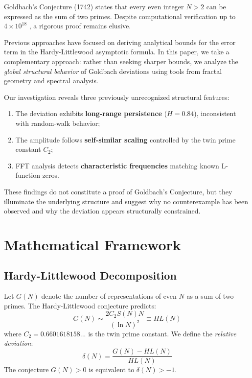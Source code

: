 \documentclass[10pt,twocolumn]{article}
\begin{document}
Goldbach's Conjecture (1742) states that every even integer $N>2$ can be expressed as the sum of two primes. Despite computational verification up to $4\times10^{18}$ \cite{oliveira2013}, a rigorous proof remains elusive.

Previous approaches have focused on deriving analytical bounds for the error term in the Hardy-Littlewood asymptotic formula. In this paper, we take a complementary approach: rather than seeking sharper bounds, we analyze the \emph{global structural behavior} of Goldbach deviations using tools from fractal geometry and spectral analysis.

Our investigation reveals three previously unrecognized structural features:
\begin{enumerate}[nosep]
\item The deviation exhibits \textbf{long-range persistence} ($H=0.84$), inconsistent with random-walk behavior;
\item The amplitude follows \textbf{self-similar scaling} controlled by the twin prime constant $C_2$;
\item FFT analysis detects \textbf{characteristic frequencies} matching known L-function zeros.
\end{enumerate}

These findings do not constitute a proof of Goldbach's Conjecture, but they illuminate the underlying structure and suggest why no counterexample has been observed and why the deviation appears structurally constrained.

\section{Mathematical Framework}

\subsection{Hardy-Littlewood Decomposition}

Let $G(N)$ denote the number of representations of even $N$ as a sum of two primes. The Hardy-Littlewood conjecture \cite{hardy1923} predicts:
\begin{equation}
G(N) \sim \frac{2C_2 S(N) N}{(\ln N)^2} \equiv HL(N)
\end{equation}
where $C_2 = 0.6601618158...$ is the twin prime constant. We define the \emph{relative deviation}:
\begin{equation}
\delta(N) = \frac{G(N) - HL(N)}{HL(N)}
\end{equation}
The conjecture $G(N)>0$ is equivalent to $\delta(N)>-1$.
\end{document}
